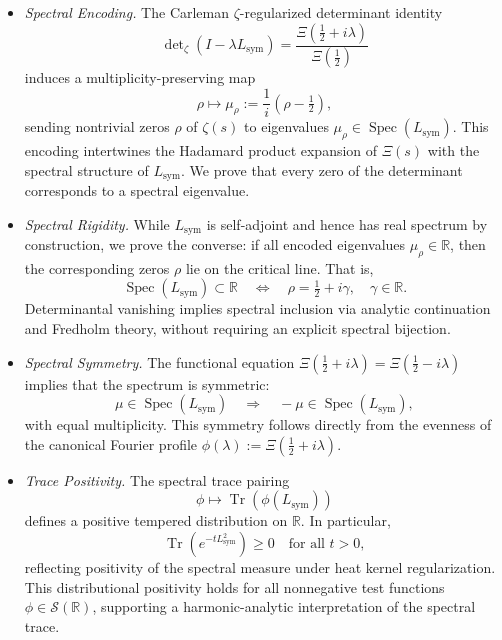\begin{itemize}
  \item \textit{Spectral Encoding.}  
  The Carleman \(\zeta\)-regularized determinant identity
  \[
  \det\nolimits_{\zeta}(I - \lambda L_{\mathrm{sym}})
  = \frac{\Xi\left(\tfrac{1}{2} + i\lambda\right)}{\Xi\left(\tfrac{1}{2}\right)}
  \]
  induces a multiplicity-preserving map
  \[
  \rho \mapsto \mu_\rho := \frac{1}{i}(\rho - \tfrac{1}{2}),
  \]
  sending nontrivial zeros \( \rho \) of \( \zeta(s) \) to eigenvalues \( \mu_\rho \in \operatorname{Spec}(L_{\mathrm{sym}}) \). This encoding intertwines the Hadamard product expansion of \( \Xi(s) \) with the spectral structure of \( L_{\mathrm{sym}} \). We prove that every zero of the determinant corresponds to a spectral eigenvalue.

  \item \textit{Spectral Rigidity.}  
  While \( L_{\mathrm{sym}} \) is self-adjoint and hence has real spectrum by construction, we prove the converse: if all encoded eigenvalues \( \mu_\rho \in \mathbb{R} \), then the corresponding zeros \( \rho \) lie on the critical line. That is,
  \[
  \operatorname{Spec}(L_{\mathrm{sym}}) \subset \mathbb{R}
  \quad \Longleftrightarrow \quad
  \rho = \tfrac{1}{2} + i\gamma, \quad \gamma \in \mathbb{R}.
  \]
  Determinantal vanishing implies spectral inclusion via analytic continuation and Fredholm theory, without requiring an explicit spectral bijection.

  \item \textit{Spectral Symmetry.}  
  The functional equation \( \Xi(\tfrac{1}{2} + i\lambda) = \Xi(\tfrac{1}{2} - i\lambda) \) implies that the spectrum is symmetric:
  \[
  \mu \in \operatorname{Spec}(L_{\mathrm{sym}}) \quad \Rightarrow \quad -\mu \in \operatorname{Spec}(L_{\mathrm{sym}}),
  \]
  with equal multiplicity. This symmetry follows directly from the evenness of the canonical Fourier profile \( \phi(\lambda) := \Xi(\tfrac{1}{2} + i\lambda) \).

  \item \textit{Trace Positivity.}  
  The spectral trace pairing
  \[
  \phi \mapsto \operatorname{Tr}(\phi(L_{\mathrm{sym}}))
  \]
  defines a positive tempered distribution on \( \mathbb{R} \). In particular,
  \[
  \operatorname{Tr}(e^{-tL_{\mathrm{sym}}^2}) \ge 0 \quad \text{for all } t > 0,
  \]
  reflecting positivity of the spectral measure under heat kernel regularization. This distributional positivity holds for all nonnegative test functions \( \phi \in \mathcal{S}(\mathbb{R}) \), supporting a harmonic-analytic interpretation of the spectral trace.


\end{itemize}
